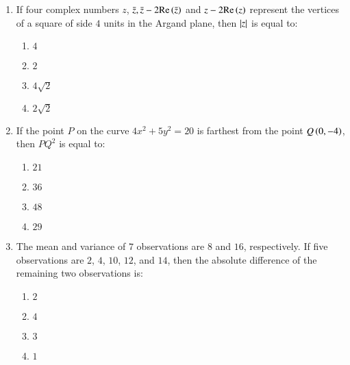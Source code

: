 \documentclass[journal]{IEEEtran}
\begin{document}
\begin{enumerate}
    \item If four complex numbers $z$, $\bar{z},\bar{z} - 2 \text{Re}\left(\bar{z}\right)$ and $z - 2 \text{Re}\left(z\right)$ represent the vertices of a square of side $4$ units in the Argand plane, then $\left\vert z\right\vert$ is equal to:
    \begin{enumerate}
        \item $4$
        \item $2$
        \item $4\sqrt{2}$
        \item $2\sqrt{2}$
    \end{enumerate}

    \item If the point $P$ on the curve $4x^2 + 5y^2 = 20$ is farthest from the point $Q\left(0, -4\right)$, then $PQ^2$ is equal to:
    \begin{enumerate}
        \item $21$
        \item $36$
        \item $48$
        \item $29$
    \end{enumerate}

    \item The mean and variance of $7$ observations are $8$ and $16$, respectively. If five observations are $2$, $4$, $10$, $12$, and $14$, then the absolute difference of the remaining two observations is:
    \begin{enumerate}
        \item $2$
        \item $4$
        \item $3$
        \item $1$
    \end{enumerate}
\end{enumerate}



  
\end{document}

